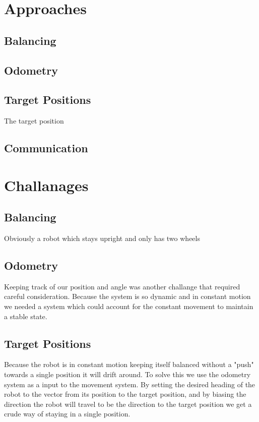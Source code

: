 \documentclass[12pt]{article}
\begin{document}
\section{Approaches}


\subsection{Balancing}
\subsection{Odometry}
\subsection{Target Positions}
The target position 
\subsection{Communication}

\section{Challanages}

\subsection{Balancing}
Obviously a robot which stays upright and only has two wheels 
\subsection{Odometry}
Keeping track of our position and angle was another challange that required careful consideration. Because the system is so dynamic and in constant motion we needed a system which could account for the constant movement to maintain a stable state.
\subsection{Target Positions}
Because the robot is in constant motion keeping itself balanced without a "push" towards a single position it will drift around. To solve this we use the odometry system as a input to the movement system. By setting the desired heading of the robot to the vector from its position to the target position, and by biasing the direction the robot will travel to be the direction to the target position we get a crude way of staying in a single position.
\end{document}
